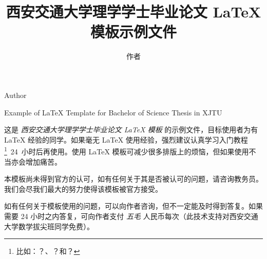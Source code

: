 \documentclass[%
               print, 
               timesmath
              ]{xjtubsc}
\begin{document}

\author{作者}{Author}	%
\title{西安交通大学理学学士毕业论文 \LaTeX{} 模板示例文件}{Example of \LaTeX{} Template for Bachelor of Science Thesis in XJTU}	%


\begin{INFObackground} %


\end{INFObackground}

\begin{INFOdata} %


\end{INFOdata}

\begin{INFOtask} %


\end{INFOtask}

\begin{INFOrequirement} %


\end{INFOrequirement}

\begin{INFOsubmit} %


\end{INFOsubmit}

\begin{INFOreference} %


\end{INFOreference}

\frontmatter

\extrapages %

\begin{abstractcn} %
这是 \emph{西安交通大学理学学士毕业论文 \LaTeX{} 模板} 的示例文件，目标使用者为有 \LaTeX{} 经验的同学。如果毫无 \LaTeX{} 使用经验，强烈建议认真学习入门教程\footnote{比如：？、？和？}~24~小时后再使用。使用 LaTeX 模板可减少很多排版上的烦恼，但如果使用不当亦会增加痛苦。

本模板尚未得到官方的认可，如有任何关于其是否被认可的问题，请咨询教务员。我们会尽我们最大的努力使得该模板被官方接受。

如有任何关于模板使用的问题，可以向作者咨询，但不一定能及时得到答复。如果需要 24 小时之内答复，可向作者支付 \emph{五毛} 人民币每次（此技术支持对西安交通大学数学拔尖班同学免费）。

\end{abstractcn}
\end{document}
